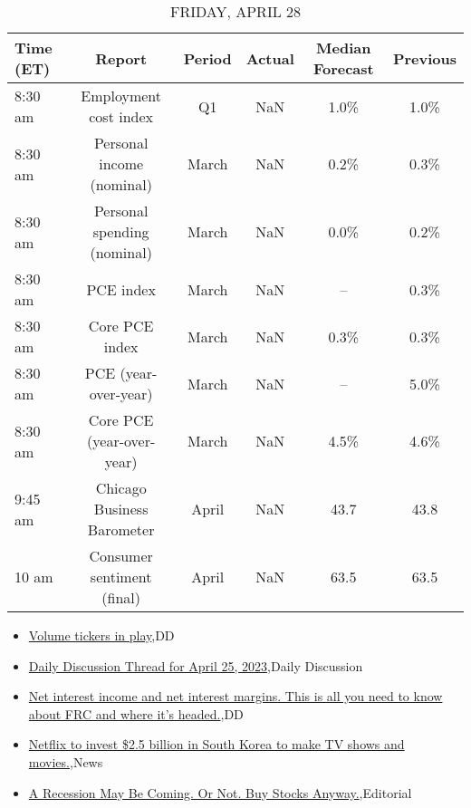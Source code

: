 \documentclass{article}%
\begin{document}
\begin{table}[htbp]%
\caption{FRIDAY, APRIL 28}%
\centering%
\begin{adjustbox}{width=1\textwidth}%
\begin{tabular}{lccccc}
\toprule
Time (ET) &                      Report & Period & Actual & Median Forecast & Previous \\
\midrule
  8:30 am &       Employment cost index &     Q1 &    NaN &            1.0\% &     1.0\% \\
  8:30 am &   Personal income (nominal) &  March &    NaN &            0.2\% &     0.3\% \\
  8:30 am & Personal spending (nominal) &  March &    NaN &            0.0\% &     0.2\% \\
  8:30 am &                   PCE index &  March &    NaN &              -- &     0.3\% \\
  8:30 am &              Core PCE index &  March &    NaN &            0.3\% &     0.3\% \\
  8:30 am &        PCE (year-over-year) &  March &    NaN &              -- &     5.0\% \\
  8:30 am &   Core PCE (year-over-year) &  March &    NaN &            4.5\% &     4.6\% \\
  9:45 am &  Chicago Business Barometer &  April &    NaN &            43.7 &     43.8 \\
    10 am &  Consumer sentiment (final) &  April &    NaN &            63.5 &     63.5 \\
\bottomrule
\end{tabular}
%
\end{adjustbox}%
\end{table}

%
\begin{itemize}%
\item%
\href{https://reddit.com/r/wallstreetbets/comments/12yhja0/volume\_tickers\_in\_play/}{Volume tickers in play},DD%
\item%
\href{https://reddit.com/r/wallstreetbets/comments/12yeq5i/daily\_discussion\_thread\_for\_april\_25\_2023/}{Daily Discussion Thread for April 25, 2023},Daily Discussion%
\item%
\href{https://reddit.com/r/wallstreetbets/comments/12ydzy8/net\_interest\_income\_and\_net\_interest\_margins\_this/}{Net interest income and net interest margins. This is all you need to know about FRC and where it's headed.},DD%
\item%
\href{https://reddit.com/r/StockMarket/comments/12yam5z/netflix\_to\_invest\_25\_billion\_in\_south\_korea\_to/}{Netflix to invest \$2.5 billion in South Korea to make TV shows and movies.},News%
\item%
\href{https://reddit.com/r/Economics/comments/12yaspb/a\_recession\_may\_be\_coming\_or\_not\_buy\_stocks\_anyway/}{A Recession May Be Coming. Or Not. Buy Stocks Anyway.},Editorial%
\end{itemize}%
\end{document}
